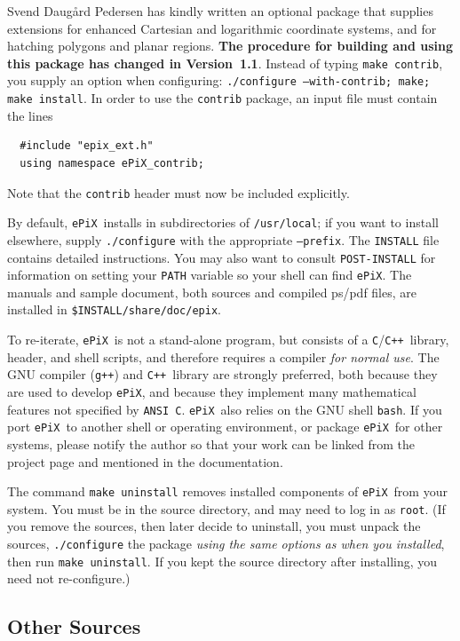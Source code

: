 \documentclass[12pt]{report}
\newcommand{\code}[1]{\texttt{#1}}
\newcommand{\filename}[1]{\texttt{#1}}
\newcommand{\ePiX}{\code{ePiX}}
\newcommand{\C}{\code{C}}
\newcommand{\CXX}{\code{C++}}
\begin{document}
Svend Daug{\aa}rd Pedersen has kindly written an optional package that
supplies extensions for enhanced Cartesian and logarithmic coordinate
systems, and for hatching polygons and planar regions. \textbf{The
  procedure for building and using this package has changed in
  Version~1.1}. Instead of typing \code{make contrib}, you supply an
option when configuring: \code{./configure --with-contrib; make; make
  install}.  In order to use the \filename{contrib} package, an input
file must contain the lines
\begin{verbatim}
  #include "epix_ext.h"
  using namespace ePiX_contrib;
\end{verbatim}
Note that the \code{contrib} header must now be included explicitly.

By default, \ePiX\ installs in subdirectories of
\filename{/usr/local}; if you want to install elsewhere, supply
\code{./configure} with the appropriate \code{--prefix}. The
\filename{INSTALL} file contains detailed instructions. You may also
want to consult \filename{POST-INSTALL} for information on setting
your \code{PATH} variable so your shell can find \ePiX.  The manuals
and sample document, both sources and compiled ps/pdf files, are
installed in \filename{\$INSTALL/share/doc/epix}.

To re-iterate, \ePiX\ is not a stand-alone program, but consists of a
\C/\CXX\ library, header, and shell scripts, and therefore requires a
compiler \emph{for normal use}. The GNU compiler (\code{g++}) and
\CXX\ library are strongly preferred, both because they are used to
develop \ePiX, and because they implement many mathematical features
not specified by \code{ANSI~C}.  \ePiX\ also relies on the GNU shell
\code{bash}. If you port \ePiX\ to another shell or operating
environment, or package \ePiX\ for other systems, please notify the
author so that your work can be linked from the project page and
mentioned in the documentation.

The command \code{make uninstall} removes installed components of
\ePiX\ from your system. You must be in the source directory, and may
need to log in as \code{root}. (If you remove the sources, then later
decide to uninstall, you must unpack the sources, \code{./configure}
the package \emph{using the same options as when you installed}, then
run \code{make uninstall}. If you kept the source directory after
installing, you need not re-configure.)


\subsection*{Other Sources}
\end{document}
